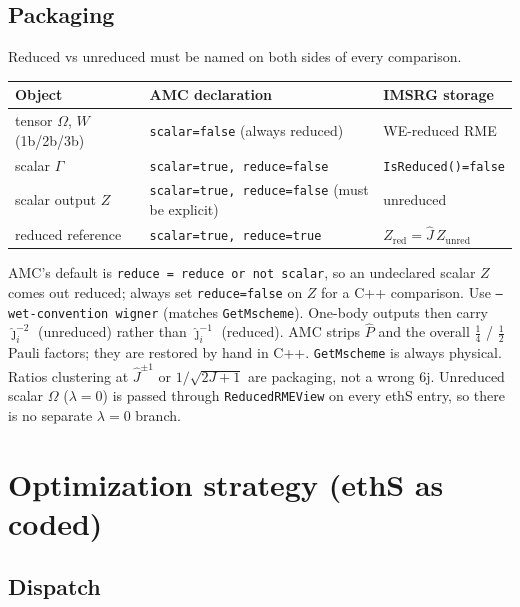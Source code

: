 \documentclass[enabledeprecatedfontcommands]{scrartcl}
\newcommand{\codename}[1]{\texttt{#1}}
\begin{document}
\subsection{Packaging}
\label{sec:js-pack}

Reduced vs unreduced must be named on both sides of every comparison.
\begin{center}
\small
\begin{tabular}{@{}p{}p{}p{}@{}}
\hline
Object & AMC declaration & IMSRG storage \\
\hline
tensor $\Omega$, $W$ (1b/2b/3b) & \texttt{scalar=false} (always reduced) &
  WE-reduced RME \\
scalar $\Gamma$ & \texttt{scalar=true, reduce=false} &
  \codename{IsReduced()=false} \\
scalar output $Z$ & \texttt{scalar=true, reduce=false} (must be explicit) &
  unreduced \\
reduced reference & \texttt{scalar=true, reduce=true} &
  $Z_{\mathrm{red}}=\hat J\,Z_{\mathrm{unred}}$ \\
\hline
\end{tabular}
\end{center}
AMC's default is \texttt{reduce = reduce or not scalar}, so an undeclared
scalar $Z$ comes out reduced; always set \texttt{reduce=false} on $Z$ for
a C++ comparison. Use \texttt{--wet-convention wigner} (matches
\codename{GetMscheme}). One-body outputs then carry
$\hat\jmath_i^{-2}$ (unreduced) rather than $\hat\jmath_i^{-1}$ (reduced).
AMC strips $\hat P$ and the overall $\tfrac14$ / $\tfrac12$ Pauli factors;
they are restored by hand in C++.
\codename{GetMscheme} is always physical. Ratios clustering at
$\hat J^{\pm1}$ or $1/\sqrt{2J+1}$ are packaging, not a wrong 6j.
Unreduced scalar $\Omega$ ($\lambda=0$) is passed through
\codename{ReducedRMEView} on every ethS entry, so there is no separate
$\lambda=0$ branch.

\section{Optimization strategy (ethS as coded)}
\label{sec:opt}
\sloppy

\subsection{Dispatch}
\end{document}
